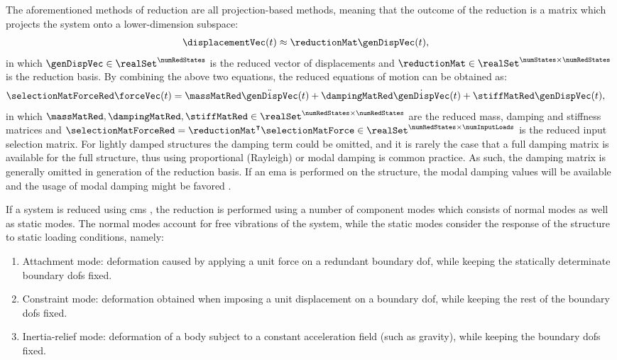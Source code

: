 The aforementioned methods of reduction are all projection-based methods, meaning that the outcome of the reduction is a matrix which projects the system onto a lower-dimension subspace:
\begin{align}
    \displacementVec (t) & \approx \reductionMat \genDispVec (t),
\end{align}
in which \( \genDispVec \in \realSet^{\numRedStates} \) is the reduced vector of displacements and \(\reductionMat \in \realSet^{\numStates \times \numRedStates}\) is the reduction basis. By combining the above two equations, the reduced equations of motion can be obtained as:
\begin{align}
    \selectionMatForceRed \forceVec (t) & = \massMatRed \ddot{\genDispVec}(t) + \dampingMatRed \dot{\genDispVec}(t) + \stiffMatRed \genDispVec (t),
    \label{eq:S3_eomReduced}
\end{align}
in which \(\massMatRed,\dampingMatRed,\stiffMatRed \in \realSet^{\numRedStates \times \numRedStates}\) are the reduced mass, damping and stiffness matrices and \(\selectionMatForceRed = \reductionMat^\intercal \selectionMatForce \in \realSet^{\numRedStates \times \numInputLoads} \) is the reduced input selection matrix. For lightly damped structures the damping term could be omitted, and it is rarely the case that a full damping matrix is available for the full structure, thus using proportional (Rayleigh) or modal damping is common practice. As such, the damping matrix is generally omitted in generation of the reduction basis. If an \gls{ema} is performed on the structure, the modal damping values will be available and the usage of modal damping might be favored \cite{heylen_modal_2005}.

If a system is reduced using \gls{cms} \cite{craig_review_1985}, the reduction is performed using a number of component modes which consists of normal modes as well as static modes. The normal modes account for free vibrations of the system, while the static modes consider the response of the structure to static loading conditions, namely:
\begin{enumerate}
    \item Attachment mode: deformation caused by applying a unit force on a redundant boundary \gls{dof}, while keeping the statically determinate boundary \glspl{dof} fixed.
    \item Constraint mode: deformation obtained when imposing a unit displacement on a boundary \gls{dof}, while keeping the rest of the boundary \glspl{dof} fixed.
    \item Inertia-relief mode: deformation of a body subject to a constant acceleration field (such as gravity), while keeping the boundary \glspl{dof} fixed.
\end{enumerate}

